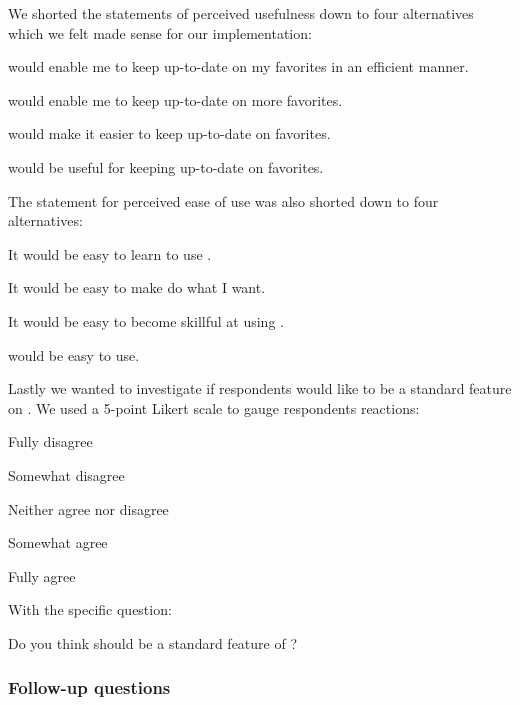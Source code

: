 We shorted the statements of perceived usefulness down to four alternatives
which we felt made sense for our implementation:

\begin{items}
  \item \latest{} would enable me to keep up-to-date on my favorites in an
    efficient manner.
  \item \latest{} would enable me to keep up-to-date on more favorites.
  \item \latest{} would make it easier to keep up-to-date on favorites.
  \item \latest{} would be useful for keeping up-to-date on favorites.
\end{items}

The statement for perceived ease of use was also shorted down to four
alternatives:

\begin{items}
  \item It would be easy to learn to use \latest{}.
  \item It would be easy to make \latest{} do what I want.
  \item It would be easy to become skillful at using \latest{}.
  \item \latest{} would be easy to use.
\end{items}

Lastly we wanted to investigate if respondents would like \latest{} to be a
standard feature on \urort{}.
We used a 5-point Likert scale \citep{likert32} to gauge respondents
reactions:

\begin{items}
  \item Fully disagree
  \item Somewhat disagree
  \item Neither agree nor disagree
  \item Somewhat agree
  \item Fully agree
\end{items}

With the specific question:

\begin{items}
  \item Do you think \latest{} should be a standard feature of \urort{}?
\end{items}

\subsubsection{Follow-up questions}

